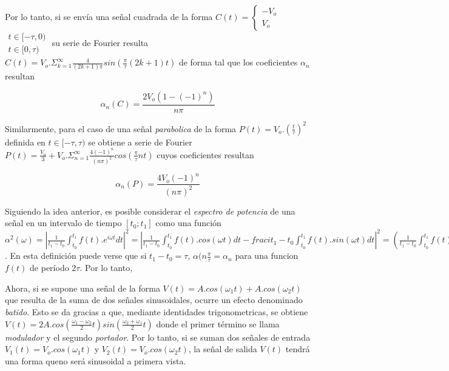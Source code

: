 \documentclass[11pt,a4paper]{article}
\begin{document}
Por lo tanto, si se envía una señal cuadrada de la forma $C(t)=
\left\{\begin{matrix}
-V_o \\ V_o
\end{matrix}\right.$
$\begin{matrix}
t\in[-\tau,0)\\ t\in[0,\tau)
\end{matrix}$
su serie de Fourier resulta $C(t) = V_o.\Sigma_{k=1}^{\infty} \frac{4}{(2k+1)\pi}sin(\frac{\pi}{\tau}(2k+1)t)$ de forma tal que los coeficientes $\alpha_n$ resultan

\begin{equation}
\alpha_n(C) = \frac{2V_o(1-(-1)^n)}{n\pi}
\label{eq:coef_cuad}
\end{equation}

Similarmente, para el caso de una señal \textit{parabolica} de la forma $P(t)=V_o.(\frac{t}{\tau})^2$ definida en $t\in[-\tau,\tau)$ se obtiene a serie de Fourier $P(t) = \frac{V_o}{3} + V_o.\Sigma_{n=1}^{\infty} \frac{4(-1)^n}{(n\pi)^2}cos(\frac{\pi}{\tau}nt)$ cuyos coeficientes resultan

\begin{equation}
\alpha_n(P) = \frac{4V_o(-1)^n}{(n\pi)^2}
\label{eq:coef_parab}
\end{equation}

Siguiendo la idea anterior, es posible considerar el \textit{espectro de potencia} de una señal en un intervalo de tiempo $[t_0;t_1]$ como una función $\alpha^2(\omega) = |\frac{1}{t_1-t_0}\int_{t_0}^{t_1} f(t).e^{i\omega t}dt|^2= |\frac{1}{t_1-t_0}\int_{t_0}^{t_1} f(t).cos(\omega t)dt - frac{i}{t_1-t_0}\int_{t_0}^{t_1} f(t).sin(\omega t)dt|^2 = (\frac{1}{t_1-t_0}\int_{t_0}^{t_1} f(t).cos(\omega t)dt)^2+(\frac{1}{t_1-t_0}\int_{t_0}^{t_1} f(t).sin(\omega t)dt)^2$. En esta definición puede verse que si $t_1-t_0=\tau$, $\alpha(n\frac{\pi}{\tau} = \alpha_n$ para una funcion $f(t)$ de período $2\tau$. Por lo tanto, 

Ahora, si se supone una señal de la forma $V(t) = A.cos(\omega_1t) + A.cos(\omega_2t)$ que resulta de la suma de dos señales sinusoidales, ocurre un efecto denominado \textit{batido}. Esto se da gracias a que, mediante identidades trigonometricas, se obtiene $V(t) = 2A.cos(\frac{\omega_1-\omega_2}{2}t)sin(\frac{\omega_2+\omega_1}{2}t)$ donde el primer término se llama \textit{modulador} y el segundo \textit{portador}. Por lo tanto, si se suman dos señales de entrada 
$V_1(t) = V_o.cos(\omega_1t)$ y $V_2(t) = V_o.cos(\omega_2t)$, la señal de salida $V(t)$ tendrá una forma queno será sinusoidal a primera vista. 
\end{document}
